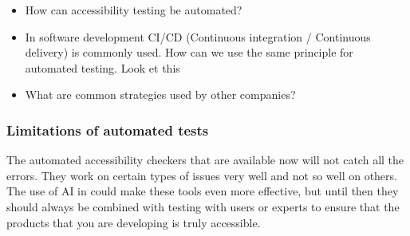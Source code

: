 \documentclass{master_thesis}
\begin{document}
\begin{itemize}
	\item How can accessibility testing be automated?
	\item In software development CI/CD (Continuous integration / Continuous delivery) is commonly used. How can we use the same principle for automated testing. Look et this \citep{}
	\item What are common strategies used by other companies?
\end{itemize}

\subsubsection{Limitations of automated tests}

The automated accessibility checkers that are available now will not catch all the errors. They work on certain types of issues very well and not so well on others. The use of AI in could make these tools even more effective,  but until then they should always be combined with testing with users or experts to ensure that the products that you are developing is truly accessible.
\end{document}
